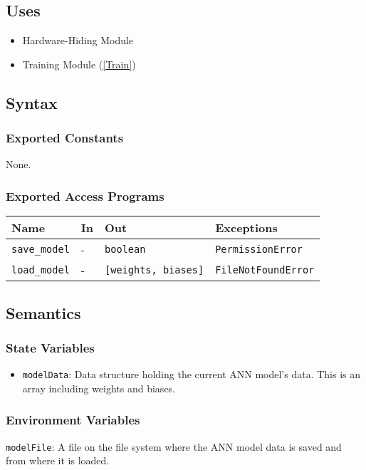 \documentclass[12pt, titlepage]{article}
\def\code#1{\texttt{#1}}
\begin{document}
\subsection{Uses}
\begin{itemize}
  \item Hardware-Hiding Module  
  \item Training Module (\ref{Train})
\end{itemize}


\subsection{Syntax}

\subsubsection{Exported Constants}
None.

\subsubsection{Exported Access Programs}

\begin{center}
\begin{tabular}{p{2cm} p{4cm} p{4cm} p{3.5cm}}
\hline
\textbf{Name} & \textbf{In} & \textbf{Out} & \textbf{Exceptions} \\
\hline
\code{save\_model} & - & \code{boolean} & \code{PermissionError} \\
\code{load\_model} & - & \code{[weights, biases]} & \code{FileNotFoundError} \\
\hline
\end{tabular}
\end{center}

\subsection{Semantics}

\subsubsection{State Variables}
\begin{itemize}
  \item \code{modelData}: Data structure holding the current ANN model's data. 
This is an array including weights and biases.
\end{itemize}

\subsubsection{Environment Variables}
\code{modelFile}: A file on the file system where the ANN model data is saved and 
from where it is loaded.
\end{document}
